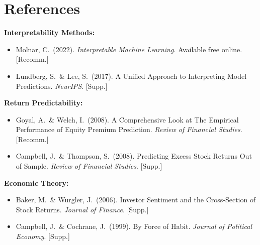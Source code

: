 \documentclass[11pt,a4paper]{article}
\begin{document}
\section*{References}

\textbf{Interpretability Methods:}
\begin{itemize}
    \item Molnar, C.\ (2022). \textit{Interpretable Machine Learning}. Available free online. [Recomm.]
    \item Lundberg, S.\ \& Lee, S.\ (2017). A Unified Approach to Interpreting Model Predictions. \textit{NeurIPS}. [Supp.]
\end{itemize}

\textbf{Return Predictability:}
\begin{itemize}
    \item Goyal, A.\ \& Welch, I.\ (2008). A Comprehensive Look at The Empirical Performance of Equity Premium Prediction. \textit{Review of Financial Studies}. [Recomm.]
    \item Campbell, J.\ \& Thompson, S.\ (2008). Predicting Excess Stock Returns Out of Sample. \textit{Review of Financial Studies}. [Supp.]
\end{itemize}

\textbf{Economic Theory:}
\begin{itemize}
    \item Baker, M.\ \& Wurgler, J.\ (2006). Investor Sentiment and the Cross-Section of Stock Returns. \textit{Journal of Finance}. [Supp.]
    \item Campbell, J.\ \& Cochrane, J.\ (1999). By Force of Habit. \textit{Journal of Political Economy}. [Supp.]
\end{itemize}
\end{document}
